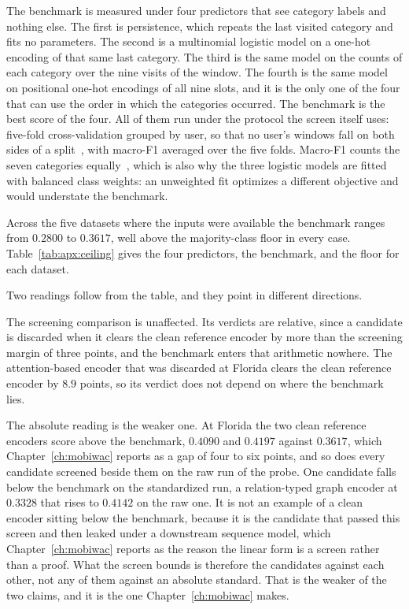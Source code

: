 The benchmark is measured under four predictors that see category labels and nothing else. The
first is persistence, which repeats the last visited category and fits no parameters. The second is
a multinomial logistic model on a one-hot encoding of that same last category. The third is the
same model on the counts of each category over the nine visits of the window. The fourth is the
same model on positional one-hot encodings of all nine slots, and it is the only one of the four
that can use the order in which the categories occurred. The benchmark is the best score of the
four. All of them run under the protocol the screen itself uses: five-fold cross-validation grouped
by user, so that no user's windows fall on both sides of a
split~\cite{kohavi1995crossval,pedregosa2011sklearn}, with macro-F1 averaged over the five folds.
Macro-F1 counts the seven categories equally~\cite{sokolova2009measures}, which is also why the
three logistic models are fitted with balanced class weights: an unweighted fit optimizes a
different objective and would understate the benchmark.

Across the five datasets where the inputs were available the benchmark ranges from $0.2800$ to
$0.3617$, well above the majority-class floor in every case.
Table~\ref{tab:apx:ceiling} gives the four predictors, the benchmark, and the floor for each
dataset.



Two readings follow from the table, and they point in different directions.

The screening comparison is unaffected. Its verdicts are relative, since a candidate is discarded
when it clears the clean reference encoder by more than the screening margin of three points, and
the benchmark enters that arithmetic nowhere. The attention-based encoder that was discarded at
Florida clears the clean reference encoder by $8.9$ points, so its verdict does not depend on where
the benchmark lies.

The absolute reading is the weaker one. At Florida the two clean reference encoders score above
the benchmark, $0.4090$ and $0.4197$ against $0.3617$, which Chapter~\ref{ch:mobiwac} reports as a
gap of four to six points, and so does every candidate screened beside them on the raw run of the
probe. One candidate falls below the benchmark on the standardized run, a relation-typed graph
encoder at $0.3328$ that rises to $0.4142$ on the raw one. It is not an example of a clean encoder
sitting below the benchmark, because it is the candidate that passed this screen and then leaked
under a downstream sequence model, which Chapter~\ref{ch:mobiwac} reports as the reason the linear
form is a screen rather than a proof. What the screen bounds is therefore the candidates against
each other, not any of them against an absolute standard. That is the weaker of the two claims, and
it is the one Chapter~\ref{ch:mobiwac} makes.

